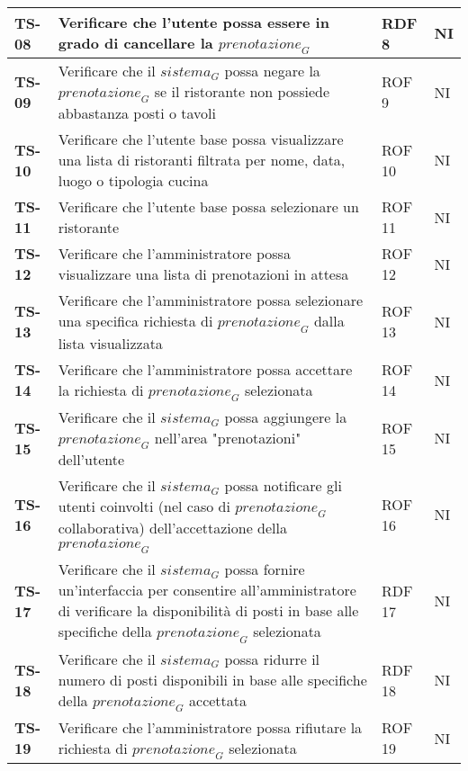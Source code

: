 \begin{longtable}{|>{\centering\arraybackslash}p{1.5cm}|p{12cm}|p{2cm}|p{1cm}|}
  \hline
  \rowcolor{gray!10}
  \textbf{TS-08} & Verificare che l'utente possa essere in grado di cancellare la $\textit{prenotazione}_G$ & RDF 8 & NI \\ 
  \hline
  \rowcolor{gray!10}
  \textbf{TS-09} & Verificare che il $\textit{sistema}_G$ possa negare la $\textit{prenotazione}_G$ se il ristorante non possiede abbastanza posti o tavoli & ROF 9 & NI \\ 
  \hline
  \rowcolor{gray!10}
  \textbf{TS-10} & Verificare che l'utente base possa visualizzare una lista di ristoranti filtrata per nome, data, luogo o tipologia cucina & ROF 10 & NI \\ 
  \hline
  \rowcolor{gray!10}
  \textbf{TS-11} & Verificare che l'utente base possa selezionare un ristorante & ROF 11 & NI \\ 
  \hline
  \rowcolor{gray!10}
  \textbf{TS-12} & Verificare che l'amministratore possa visualizzare una lista di prenotazioni in attesa & ROF 12 & NI \\
  \hline
  \rowcolor{gray!10}
  \textbf{TS-13} & Verificare che l'amministratore possa selezionare una specifica richiesta di $\textit{prenotazione}_G$ dalla lista visualizzata & ROF 13 & NI \\ 
  \hline
  \rowcolor{gray!10}
  \textbf{TS-14} & Verificare che l'amministratore possa accettare la richiesta di $\textit{prenotazione}_G$ selezionata & ROF 14 & NI \\ 
  \hline
  \rowcolor{gray!10}
  \textbf{TS-15} & Verificare che il $\textit{sistema}_G$ possa aggiungere la $\textit{prenotazione}_G$ nell'area "prenotazioni" dell'utente & ROF 15 & NI \\
  \hline
  \rowcolor{gray!10}
  \textbf{TS-16} & Verificare che il $\textit{sistema}_G$ possa notificare gli utenti coinvolti (nel caso di $\textit{prenotazione}_G$ collaborativa) dell'accettazione della $\textit{prenotazione}_G$ & ROF 16 & NI \\ 
  \hline
  \rowcolor{gray!10}
  \textbf{TS-17} & Verificare che il $\textit{sistema}_G$ possa fornire un'interfaccia per consentire all'amministratore di verificare la disponibilità di posti in base alle specifiche della $\textit{prenotazione}_G$ selezionata & RDF 17 & NI \\ 
  \hline
  \rowcolor{gray!10}
  \textbf{TS-18} & Verificare che il $\textit{sistema}_G$ possa ridurre il numero di posti disponibili in base alle specifiche della $\textit{prenotazione}_G$ accettata & RDF 18 & NI \\ 
  \hline
  \rowcolor{gray!10}
  \textbf{TS-19} & Verificare che l'amministratore possa rifiutare la richiesta di $\textit{prenotazione}_G$ selezionata & ROF 19 & NI \\ 

\end{longtable}
